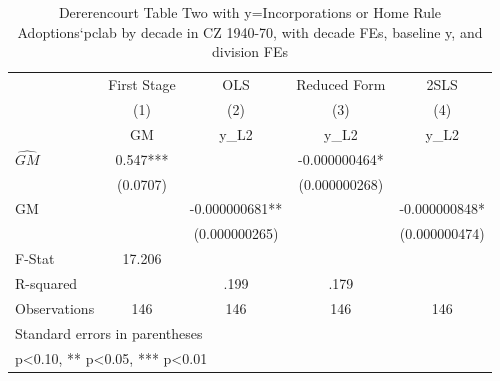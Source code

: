\begin{table}[htbp]\centering
\def\sym#1{\ifmmode^{#1}\else\(^{#1}\)\fi}
\caption{Dererencourt Table Two with y=Incorporations or Home Rule Adoptions`pclab by decade in CZ 1940-70, with decade FEs, baseline y, and division FEs}
\begin{tabular}{l*{4}{c}}
\toprule
                    & First Stage   &         OLS   &Reduced Form   &        2SLS   \\
                    &\multicolumn{1}{c}{(1)}&\multicolumn{1}{c}{(2)}&\multicolumn{1}{c}{(3)}&\multicolumn{1}{c}{(4)}\\
                    &\multicolumn{1}{c}{GM}&\multicolumn{1}{c}{y\_L2}&\multicolumn{1}{c}{y\_L2}&\multicolumn{1}{c}{y\_L2}\\
\midrule
$\hat{GM}$          &       0.547***&               &-0.000000464*  &               \\
                    &    (0.0707)   &               &(0.000000268)   &               \\
\addlinespace
GM                  &               &-0.000000681** &               &-0.000000848*  \\
                    &               &(0.000000265)   &               &(0.000000474)   \\
\midrule
F-Stat              &      17.206   &               &               &               \\
R-squared           &               &        .199   &        .179   &               \\
Observations        &         146   &         146   &         146   &         146   \\
\bottomrule
\multicolumn{5}{l}{\footnotesize Standard errors in parentheses}\\
\multicolumn{5}{l}{\footnotesize * p<0.10, ** p<0.05, *** p<0.01}\\
\end{tabular}
\end{table}
